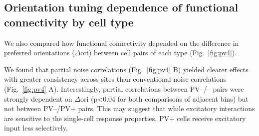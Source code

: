 \subsection{Orientation tuning dependence of functional connectivity by cell type}
We also compared how functional connectivity depended on the difference in preferred orientations ($\Delta$ori) between cell pairs of each type (Fig.~\ref{fig:pv4}).

We found that partial noise correlations (Fig.~\ref{fig:pv4} B) yielded clearer effects with greater consistency across sites than conventional noise correlations (Fig.~\ref{fig:pv4} A).   
Interestingly, partial correlations between PV--/-- pairs were strongly dependent on $\Delta$ori (p<0.04 for both comparisons of adjacent bins) but not between PV--/PV+ pairs. 
This may suggest that while excitatory interactions are sensitive to the single-cell response properties, PV+ cells receive excitatory input less selectively.

